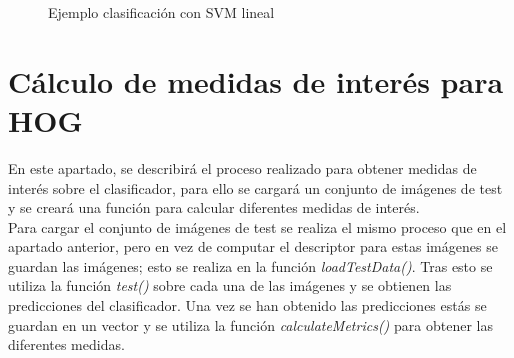 \begin{figure}[H]
	\centering
	\caption{Ejemplo clasificación con SVM lineal}
	\label{fig:salida_1}
\end{figure}

\section{Cálculo de medidas de interés para HOG}
En este apartado, se describirá el proceso realizado para obtener medidas de interés sobre el clasificador, para ello se cargará un conjunto de imágenes de test y se creará una función para calcular diferentes medidas de interés. \\

Para cargar el conjunto de imágenes de test se realiza el mismo proceso que en el apartado anterior, pero en vez de computar el descriptor para estas imágenes se guardan las imágenes; esto se realiza en la función \textit{loadTestData()}. Tras esto se utiliza la función \textit{test()} sobre cada una de las imágenes y se obtienen las predicciones del clasificador. Una vez se han obtenido las predicciones estás se guardan en un vector y se utiliza la función \textit{calculateMetrics()} para obtener las diferentes medidas. \\

